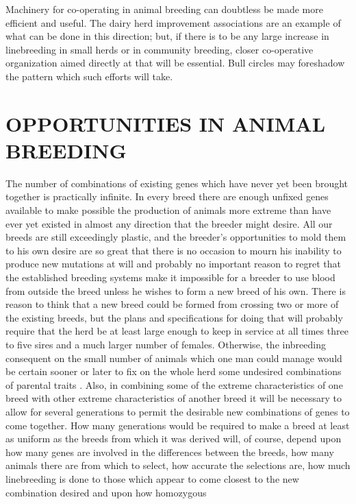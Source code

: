 Machinery for co-operating in animal breeding can doubtless be
made more efficient and useful. The dairy herd improvement associations
are an example of what can be done in this direction; but, if there
is to be any large increase in linebreeding in small herds or in community
breeding, closer co-operative organization aimed directly at that will
be essential. Bull circles may foreshadow the pattern which such efforts
will take.

\section*{OPPORTUNITIES IN ANIMAL BREEDING}

The number of combinations of existing genes which have never yet
been brought together is practically infinite. In every breed there are
enough unfixed genes available to make possible the production of animals
more extreme than have ever yet existed in almost any direction
that the breeder might desire. All our breeds are still exceedingly plastic,
and the breeder's opportunities to mold them to his own desire are
so great that there is no occasion to mourn his inability to produce new
mutations at will and probably no important reason to regret that the
established breeding systems make it impossible for a breeder to use
blood from outside the breed unless he wishes to form a new breed of
his own. There is reason to think that a new breed could be formed
from crossing two or more of the existing breeds, but the plans and
specifications for doing that will probably require that the herd be at
least large enough to keep in service at all times three to five sires and a
much larger number of females. Otherwise, the inbreeding consequent
on the small number of animals which one man could manage would
be certain sooner or later to fix on the whole herd some undesired combinations
of parental traits . Also, in combining some of the extreme
characteristics of one breed with other extreme characteristics of another
breed it will be necessary to allow for several generations to permit
the desirable new combinations of genes to come together. How many
generations would be required to make a breed at least as uniform as
the breeds from which it was derived will, of course, depend upon how
many genes are involved in the differences between the breeds, how
many animals there are from which to select, how accurate the selections
are, how much linebreeding is done to those which appear to
come closest to the new combination desired and upon how homozygous
